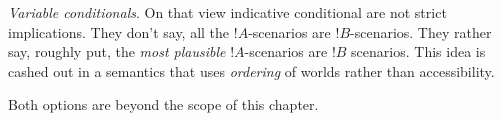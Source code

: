 \documentclass[../../../include/open-logic-section]{subfiles}
\begin{document}


\emph{Variable conditionals}. On that view indicative conditional are not strict implications. They don't say, all the $!A$-scenarios are $!B$-scenarios. They rather say, roughly put, the \emph{most plausible} $!A$-scenarios are $!B$ scenarios. This idea is cashed out in a semantics that uses \emph{ordering} of worlds rather than accessibility. 

Both options are beyond the scope of this chapter. 
\end{document}

